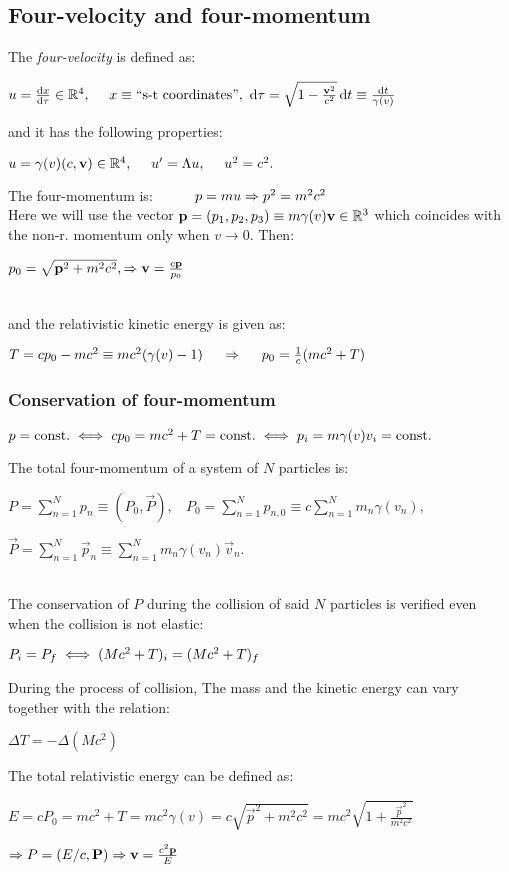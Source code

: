 \subsection{Four-velocity and four-momentum}
The \emph{four-velocity} is defined as:\\
\centerline{$u=\dv{x}{\tau}\in \R^{4},\ \ \ \ x\equiv\text{``s-t coordinates''},\ \dd{\tau}=\sqrt{1-\frac{\vec{v}^{2}}{c^{2}}}\dd{t}\equiv \frac{\dd{t}}{\gamma(v)}$}
and it has the following properties:\\
\centerline{$u=\gamma(v)(c,\vec{v})\in \R^{4},\ \ \ \ u'=\Lambda u,\ \ \ \ u^{2}=c^{2}.$}
The four-momentum is: $\ \ \ \ \ \ \ \ p=mu\then p^{2}=m^{2}c^{2}$\\
Here we will use the vector $\mathbf{p}=(p_{1},p_{2},p_{3})\equiv m\gamma(v) \mathbf{v}\in \mathbb{R}^{3}$ which coincides with the non-r. momentum only when $v\to 0$. Then:\\
\centerline{$p_{0}=\sqrt{\mathbf{p}^{2}+m^{2}c^{2}},\Rightarrow \mathbf{v}=\frac{c\mathbf{p}}{p_{0}}$}\\
and the relativistic kinetic energy is given as:\\
\centerline{$T=cp_{0}-mc^{2}\equiv mc^{2}(\gamma(v)-1)\ \ \ \ \then \ \ \ \ p_{0}=\frac{1}{c}(mc^{2}+T)$}
\subsubsection*{Conservation of four-momentum}
\centerline{$p=\text{const.}\iff cp_{0}=mc^{2}+T=\text{const.}\iff p_{i}=m\gamma(v)v_{i}=\text{\text{const.}}$}
The total four-momentum of a system of $N$ particles is:\\
\centerline{$P=\sum\limits_{n=1}^{N}p_{n}\equiv (P_{0},\vec{P}),\ \ \ \ P_{0}=\sum\limits_{n=1}^{N}p_{n,0}\equiv c\sum\limits_{n=1}^{N}m_{n}\gamma(v_{n}),$}
\centerline{$\vec{P}=\sum\limits_{n=1}^{N}\vec{p}_{n}\equiv \sum\limits_{n=1}^{N}m_{n}\gamma(v_{n})\vec{v}_{n}.$}\\
The conservation of $P$ during the collision of said $N$ particles is verified even when the collision is not elastic:\\
\centerline{$P_{i}=P_{f}\iff (Mc^{2}+T)_{i}=(Mc^{2}+T)_{f}$}
During the process of collision, The mass and the kinetic energy can vary together with the relation:\\
\centerline{$\Delta T=-\Delta (Mc^{2})$}
The total relativistic energy can be defined as:\\
\centerline{$E=cP_{0}=mc^{2}+T=mc^{2}\gamma(v)=c\sqrt{\vec{p}^{2}+m^{2}c^{2}}=mc^{2}\sqrt{1+\frac{\vec{p}^{2}}{m^{2}c^{2}}}$}
\centerline{$\Rightarrow P=(E/c,\mathbf{P})\Rightarrow \mathbf{v}=\frac{c^{2}\mathbf{p}}{E}$}



